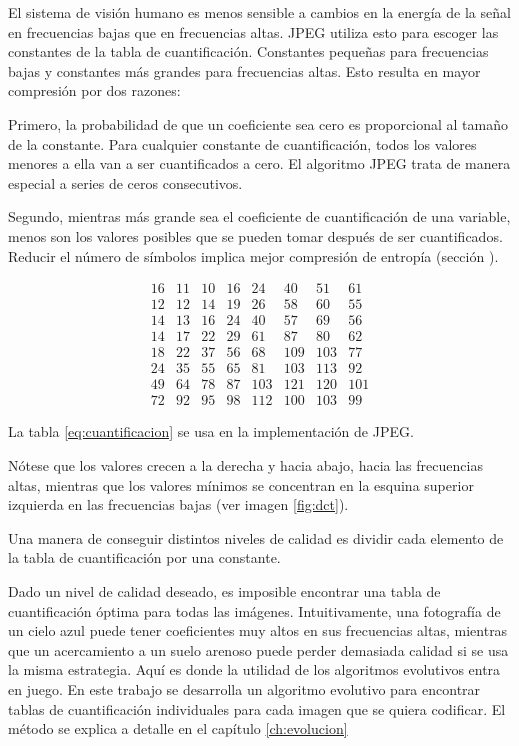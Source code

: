 El sistema de visión humano es menos sensible a cambios en la energía de la
señal en frecuencias bajas que en frecuencias altas. JPEG utiliza esto para
escoger las constantes de la tabla de cuantificación. Constantes pequeñas para
frecuencias bajas y constantes más grandes para frecuencias altas. Esto resulta
en mayor compresión por dos razones:

Primero, la probabilidad de que un coeficiente sea cero es proporcional al
tamaño de la constante. Para cualquier constante de cuantificación, todos los
valores menores a ella van a ser cuantificados a cero. El algoritmo JPEG trata
de manera especial a series de ceros consecutivos.

Segundo, mientras más grande sea el coeficiente de cuantificación de una
variable, menos son los valores posibles que se pueden tomar después de ser
cuantificados. Reducir el número de símbolos implica mejor compresión de
entropía (sección \label{sub:huffman}).

\begin{equation}
    \begin{matrix}
        16 & 11 & 10 & 16 & 24  & 40  & 51  & 61 \\
        12 & 12 & 14 & 19 & 26  & 58  & 60  & 55 \\
        14 & 13 & 16 & 24 & 40  & 57  & 69  & 56 \\
        14 & 17 & 22 & 29 & 61  & 87  & 80  & 62 \\
        18 & 22 & 37 & 56 & 68  & 109 & 103 & 77 \\
        24 & 35 & 55 & 65 & 81  & 103 & 113 & 92 \\
        49 & 64 & 78 & 87 & 103 & 121 & 120 & 101 \\
        72 & 92 & 95 & 98 & 112 & 100 & 103 & 99
    \end{matrix}
    \label{eq:cuantificacion}
\end{equation}

La tabla \ref{eq:cuantificacion} se usa en la implementación de JPEG.

Nótese que los valores crecen a la derecha y hacia abajo, hacia las frecuencias
altas, mientras que los valores mínimos se concentran en la esquina superior
izquierda en las frecuencias bajas (ver imagen \ref{fig:dct}).

Una manera de conseguir distintos niveles de calidad es dividir cada elemento
de la tabla de cuantificación por una constante.

Dado un nivel de calidad deseado, es imposible encontrar una tabla de
cuantificación óptima para todas las imágenes. Intuitivamente, una fotografía
de un cielo azul puede tener coeficientes muy altos en sus frecuencias altas,
mientras que un acercamiento a un suelo arenoso puede perder demasiada calidad
si se usa la misma estrategia. Aquí es donde la utilidad de los algoritmos
evolutivos entra en juego. En este trabajo se desarrolla un \gls{algoritmo
evolutivo} para encontrar tablas de cuantificación individuales para cada
imagen que se quiera codificar. El método se explica a detalle en el capítulo
\ref{ch:evolucion}

